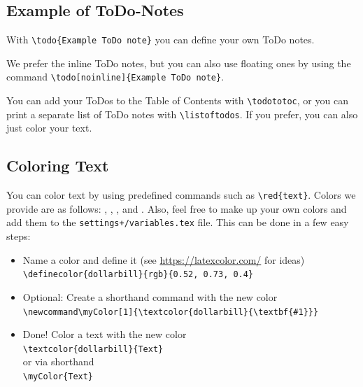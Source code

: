 \documentclass[class=scrbook, crop=false]{standalone}
\begin{document}
    \subsection{Example of ToDo-Notes}
    \label{Section::ToDo}
    With \verb|\todo{Example ToDo note}| you can define your own ToDo notes.

    We prefer the inline ToDo notes, but you can also use floating ones by using the command \verb|\todo[noinline]{Example ToDo note}|.

    You can add your ToDos to the Table of Contents with \verb|\todototoc|, or you can print a separate list of ToDo notes with \verb|\listoftodos|.
    If you prefer, you can also just color your text.

    \subsection{Coloring Text}
    \label{Section::Colors}
    You can color text by using predefined commands such as \verb|\red{text}|.
    Colors we provide are as follows: , , , and . Also, feel free to make up your own colors and add them to the \verb|settings+/variables.tex| file. This can be done in a few easy steps:
    \begin{itemize}
        \item Name a color and define it (see \url{https://latexcolor.com/} for ideas)\\
              \verb|\definecolor{dollarbill}{rgb}{0.52, 0.73, 0.4}|
        \item Optional: Create a shorthand command with the new color\\
              \verb|\newcommand\myColor[1]{\textcolor{dollarbill}{\textbf{#1}}}|
        \item Done! Color a text with the new color\\
              \verb|\textcolor{dollarbill}{Text}|\\
              or via shorthand\\
              \verb|\myColor{Text}|
    \end{itemize}
\end{document}
